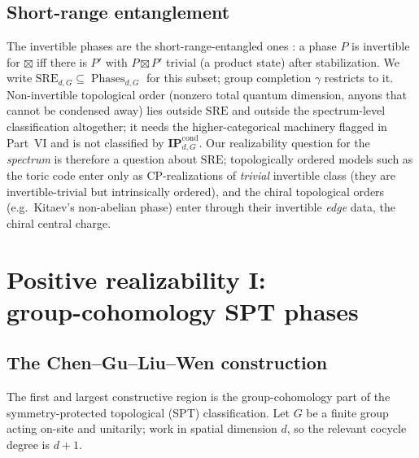 \documentclass[12pt]{article}
\newcommand{\Phases}{\operatorname{Phases}}    %
\newcommand{\IPcond}{\mathbf{IP}^{\mathrm{cond}}}  %
\newcommand{\SRE}{\mathrm{SRE}}                  %
\newcommand{\CP}{\mathrm{CP}}                    %
\theoremstyle{definition}
\theoremstyle{remark}
\begin{document}
\subsection{Short-range entanglement}

The invertible phases are the short-range-entangled ones \cite{freed-sre}: a phase $P$ is invertible for
$\boxtimes$ iff there is $P'$ with $P\boxtimes P'$ trivial (a product state) after
stabilization. We write $\SRE_{d,G}\subseteq\Phases_{d,G}$ for this subset; group completion
$\gamma$ restricts to it. Non-invertible topological order (nonzero total quantum dimension,
anyons that cannot be condensed away) lies outside $\SRE$ and outside the spectrum-level
classification altogether; it needs the higher-categorical machinery flagged in Part~VI and
is not classified by $\IPcond_{d,G}$. Our realizability question for the \emph{spectrum} is
therefore a question about $\SRE$; topologically ordered models such as the toric code enter
only as $\CP$-realizations of \emph{trivial} invertible class (they are invertible-trivial
but intrinsically ordered), and the chiral topological orders (e.g.\ Kitaev's non-abelian
phase) enter through their invertible \emph{edge} data, the chiral central charge.

\section[Positive realizability I: group-cohomology SPT phases]{Positive realizability I:\\ group-cohomology SPT phases}
\label{sec:cohomology}

\subsection{The Chen--Gu--Liu--Wen construction}

The first and largest constructive region is the group-cohomology part of the
symmetry-protected topological (SPT) classification. Let $G$ be a finite group acting
on-site and unitarily; work in spatial dimension $d$, so the relevant cocycle degree is
$d+1$.
\end{document}
